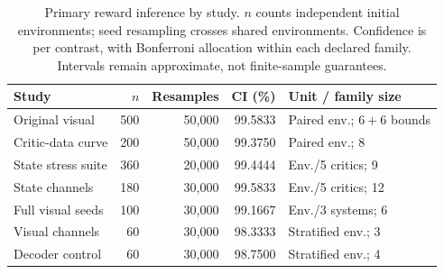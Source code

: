 \documentclass[10pt,a4paper]{article}
\begin{document}
\renewcommand{\thetable}{S\arabic{table}}
\setcounter{table}{14}
\begin{table}[H]\centering\small
\caption{Primary reward inference by study. $n$ counts independent initial environments; seed resampling crosses shared environments. Confidence is per contrast, with Bonferroni allocation within each declared family. Intervals remain approximate, not finite-sample guarantees.}
\setlength{\tabcolsep}{3pt}
\begin{tabular}{lrrrl}\toprule Study & $n$ & Resamples & CI (\%) & Unit / family size\\\midrule
Original visual & 500 & 50,000 & 99.5833 & Paired env.; $6+6$ bounds\\
Critic-data curve & 200 & 50,000 & 99.3750 & Paired env.; 8\\
State stress suite & 360 & 20,000 & 99.4444 & Env./5 critics; 9\\
State channels & 180 & 30,000 & 99.5833 & Env./5 critics; 12\\
Full visual seeds & 100 & 30,000 & 99.1667 & Env./3 systems; 6\\
Visual channels & 60 & 30,000 & 98.3333 & Stratified env.; 3\\
Decoder control & 60 & 30,000 & 98.7500 & Stratified env.; 4\\\bottomrule
\end{tabular}
\end{table}
\end{document}
